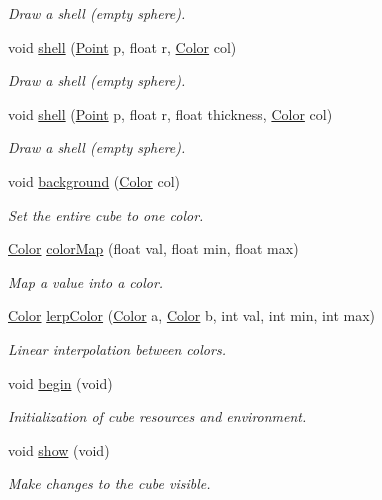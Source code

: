 \begin{DoxyCompactItemize}
\begin{DoxyCompactList}\small\item\em Draw a shell (empty sphere). \end{DoxyCompactList}\item 
void \mbox{\hyperlink{classCube_a6dcd43391777dcdc25e204f9b50173f1}{shell}} (\mbox{\hyperlink{structPoint}{Point}} p, float r, \mbox{\hyperlink{structColor}{Color}} col)
\begin{DoxyCompactList}\small\item\em Draw a shell (empty sphere). \end{DoxyCompactList}\item 
void \mbox{\hyperlink{classCube_a14c1110798f338670a998464017df23f}{shell}} (\mbox{\hyperlink{structPoint}{Point}} p, float r, float thickness, \mbox{\hyperlink{structColor}{Color}} col)
\begin{DoxyCompactList}\small\item\em Draw a shell (empty sphere). \end{DoxyCompactList}\item 
void \mbox{\hyperlink{classCube_af2bb71def4d2a272c794efbfab1ab586}{background}} (\mbox{\hyperlink{structColor}{Color}} col)
\begin{DoxyCompactList}\small\item\em Set the entire cube to one color. \end{DoxyCompactList}\item 
\mbox{\hyperlink{structColor}{Color}} \mbox{\hyperlink{classCube_a8bc792506ab5f7f55fa66a69e1be5255}{color\+Map}} (float val, float min, float max)
\begin{DoxyCompactList}\small\item\em Map a value into a color. \end{DoxyCompactList}\item 
\mbox{\hyperlink{structColor}{Color}} \mbox{\hyperlink{classCube_ab9d5f5ea67787fc718c74a4786491d36}{lerp\+Color}} (\mbox{\hyperlink{structColor}{Color}} a, \mbox{\hyperlink{structColor}{Color}} b, int val, int min, int max)
\begin{DoxyCompactList}\small\item\em Linear interpolation between colors. \end{DoxyCompactList}\item 
void \mbox{\hyperlink{classCube_a2089481fa538bf1514acf8d8ac0bc500}{begin}} (void)
\begin{DoxyCompactList}\small\item\em Initialization of cube resources and environment. \end{DoxyCompactList}\item 
void \mbox{\hyperlink{classCube_aa3f200e7c7ae119b0df57425b9f07f33}{show}} (void)
\begin{DoxyCompactList}\small\item\em Make changes to the cube visible. \end{DoxyCompactList}\end{DoxyCompactItemize}
